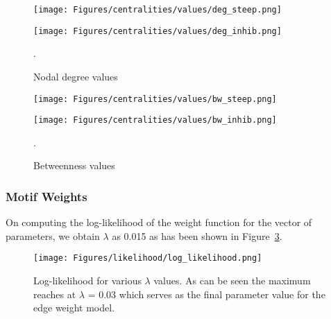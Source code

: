 \documentclass[smallextended]{svjour3}       %
\theoremstyle{definition}
\begin{document}
\begin{figure}[]
	\centering
	\hfill
	\begin{minipage}{0.50\textwidth}%
		\texttt{[image: Figures/centralities/values/deg\_steep.png]}
		\hspace*{2cm}\subcaption{}
	\end{minipage}
	\hfill
	\begin{minipage}{0.40\textwidth}
		\texttt{[image: Figures/centralities/values/deg\_inhib.png]}
		\hspace*{2cm}\subcaption{}
	\end{minipage}
	\hfill
	\caption{Nodal degree values}. 
	\label{fig:deg}
\end{figure}


\begin{figure}[]
	\centering
	\hfill
	\begin{minipage}{0.50\textwidth}%
		\texttt{[image: Figures/centralities/values/bw\_steep.png]}
		\hspace*{2cm}\subcaption{}
	\end{minipage}
	\hfill
	\begin{minipage}{0.40\textwidth}
		\texttt{[image: Figures/centralities/values/bw\_inhib.png]}
		\hspace*{2cm}\subcaption{}
	\end{minipage}

	\hfill
	\label{fig:bw}
	\caption{Betweenness values}. 
\end{figure}

\subsubsection{Motif Weights}
On computing the log-likelihood of the weight function for the vector of parameters, we obtain $\lambda$ as 0.015 as has been shown in Figure~\ref{fig:log_likelihood}.

\begin{figure}[h!]
	\centering
	\texttt{[image: Figures/likelihood/log\_likelihood.png]}
	\caption{Log-likelihood for various $\lambda$ values. As can be seen the maximum reaches at $\lambda$ = 0.03 which serves as the final parameter value for the edge weight model.}
	\label{fig:log_likelihood}
\end{figure}
\end{document}
